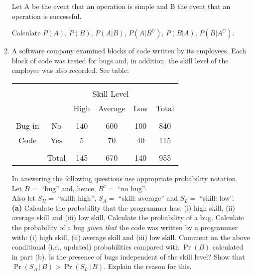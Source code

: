 \documentclass[a4paper,12pt]{article}
\begin{document}
\begin{enumerate}
\begin{center}
\begin{tabular}{|c|c|c|}
\end{tabular} 
\end{center}


Let A be the event that an operation is simple and B the event that an operation is successful. 

Calculate $P(A)$, $P(B)$, $P(A|B)$, $P(A|B^C)$, $P(B|A)$, $P(B|A^C)$.	

\item 
A software company examined blocks of code written by its employees. Each block of code was tested for bugs and, in addition, the skill level of the employee was also recorded. See table:
\begin{center}
	\begin{tabular}{|cc|ccc|c|}
		\hline
		&&&&&\\[-0.4cm]
		&& \multicolumn{3}{|c|}{Skill Level} &  \\
		&& High & Average & Low & Total \\
		\hline
		&&&&&\\[-0.4cm]
		Bug in   & No    &  140 &   600  & 100 & 840 \\
		Code & Yes   &    5 &    70  &  40 & 115 \\
		\hline
		&&&&&\\[-0.4cm]
		&Total &  145 &   670  & 140 & 955 \\
		\hline
	\end{tabular}
\end{center}
In answering the following questions use appropriate probability notation.\\[0.2cm]
Let $B =$ ``bug'' and, hence, $B^c =$ ``no bug''.\\[0.1cm]
Also let $S_H = $ ``skill: high'', $S_A = $ ``skill: average'' and $S_L =$ ``skill: low''.\\[-0.2cm]

{\bf(a)} Calculate the probability that the programmer has: (i) high skill, (ii) average skill and (iii) low skill.  Calculate the probability of a bug.  Calculate the probability of a bug \emph{given that} the code was written by a programmer with: (i) high skill, (ii) average skill and (iii) low skill.  Comment on the above conditional (i.e., updated) probabilities compared with $\Pr(B)$ calculated in part (b). Is the presence of bugs independent of the skill level?  Show that $\Pr(S_A\,|\,B) > \Pr(S_L\,|\,B)$. Explain the reason for this.


\end{enumerate}
\end{document}
